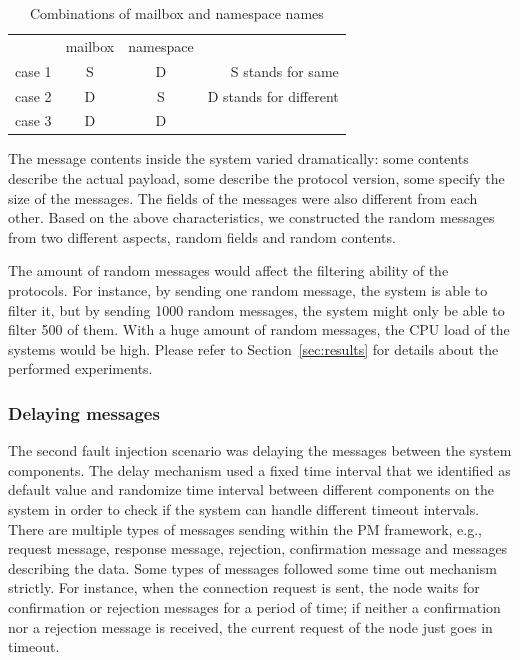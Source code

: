\begin{table}[ht!]
\centering
\begin{tabular}{| c | c | c |r}
 \cline{1-3}
       & mailbox & namespace \\ 
 \cline{1-3}
 case 1 & S & D & \hspace{1.3cm} S stands for same\\ 
 \cline{1-3}
 case 2 & D & S & D stands for different\\ 
 \cline{1-3}
 case 3 & D & D & \\ 
 \cline{1-3}
\end{tabular}
\caption{Combinations of mailbox and namespace names} %
\label{table:4.1}
\end{table}

The message contents inside the system varied dramatically: some contents describe the actual payload, some describe the protocol version, some specify the size of the messages. The fields of the messages were also different from each other. Based on the above characteristics, we constructed the random messages from two different aspects, random fields and random contents. 

The amount of random messages would affect the filtering ability of the protocols. For instance, by sending one random message, the system is able to filter it, but by sending 1000 random messages, the system might only be able to filter 500 of them. With a huge amount of random messages, the CPU load of the systems would be high. Please refer to Section~\ref{sec:results} for details about the performed experiments. 

\subsubsection{Delaying messages}
The second fault injection scenario was delaying the messages between the system components. The delay mechanism used a fixed time interval that we identified as default value and randomize time interval between different components on the system in order to check if the system can handle different timeout intervals. There are multiple types of messages sending within the PM framework, e.g., request message, response message, rejection, confirmation message and messages describing the data. Some types of messages followed some time out mechanism strictly. For instance, when the connection request is sent, the node waits for confirmation or rejection messages for a period of time; if neither a confirmation nor a rejection message is received, the current request of the node just goes in timeout. 

